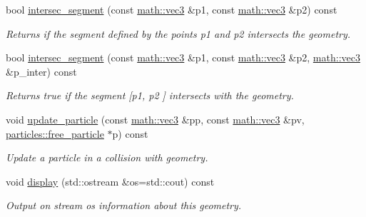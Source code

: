 \begin{DoxyCompactItemize}
bool \hyperlink{classphysim_1_1geom_1_1sphere_adb110ef393addb0ea8eb980d223f76ed}{intersec\+\_\+segment} (const \hyperlink{structphysim_1_1math_1_1vec3}{math\+::vec3} \&p1, const \hyperlink{structphysim_1_1math_1_1vec3}{math\+::vec3} \&p2) const
\begin{DoxyCompactList}\small\item\em Returns if the segment defined by the points {\itshape p1} and {\itshape p2} intersects the geometry. \end{DoxyCompactList}\item 
bool \hyperlink{classphysim_1_1geom_1_1sphere_a6b569b7cd70b5b63936225263ce1c400}{intersec\+\_\+segment} (const \hyperlink{structphysim_1_1math_1_1vec3}{math\+::vec3} \&p1, const \hyperlink{structphysim_1_1math_1_1vec3}{math\+::vec3} \&p2, \hyperlink{structphysim_1_1math_1_1vec3}{math\+::vec3} \&p\+\_\+inter) const
\begin{DoxyCompactList}\small\item\em Returns true if the segment \mbox{[}{\itshape p1}, {\itshape p2} \mbox{]} intersects with the geometry. \end{DoxyCompactList}\item 
void \hyperlink{classphysim_1_1geom_1_1sphere_ae0cfe015fd89080d614c77c0d9042b04}{update\+\_\+particle} (const \hyperlink{structphysim_1_1math_1_1vec3}{math\+::vec3} \&pp, const \hyperlink{structphysim_1_1math_1_1vec3}{math\+::vec3} \&pv, \hyperlink{classphysim_1_1particles_1_1free__particle}{particles\+::free\+\_\+particle} $\ast$p) const
\begin{DoxyCompactList}\small\item\em Update a particle in a collision with geometry. \end{DoxyCompactList}\item 
\mbox{\label{classphysim_1_1geom_1_1sphere_a846d1e7501e62b3656b000e8e6a0b422}} 
void \hyperlink{classphysim_1_1geom_1_1sphere_a846d1e7501e62b3656b000e8e6a0b422}{display} (std\+::ostream \&os=std\+::cout) const
\begin{DoxyCompactList}\small\item\em Output on stream {\itshape os} information about this geometry. \end{DoxyCompactList}\end{DoxyCompactItemize}
